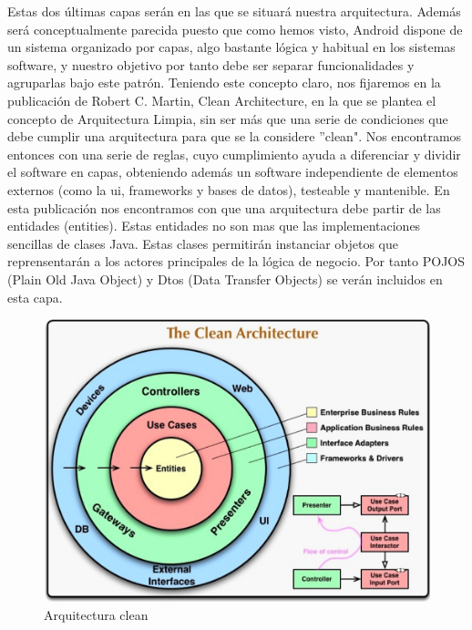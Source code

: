 \documentclass[12pt,a4paper,oneside]{book} %
\begin{document}
Estas dos últimas capas serán en las que se situará nuestra arquitectura. Además será conceptualmente parecida puesto que como hemos visto, Android dispone de un sistema organizado por capas, algo bastante lógica y habitual en los sistemas software, y nuestro objetivo por tanto debe ser separar funcionalidades y agruparlas bajo este patrón.
\newpage
\break
Teniendo este concepto claro, nos fijaremos en la publicación de Robert C. Martin, Clean Architecture, en la que se plantea el concepto de Arquitectura Limpia, sin ser más que una serie de condiciones que debe cumplir una arquitectura para que se la considere ”clean". Nos encontramos entonces con una serie de reglas, cuyo cumplimiento ayuda a diferenciar y dividir el software en capas, obteniendo además un software independiente de elementos externos (como la ui, frameworks y bases de datos), testeable y mantenible. 
\newline
\newline
En esta publicación nos encontramos con que una arquitectura debe partir de las entidades (entities). Estas entidades no son mas que las implementaciones sencillas de clases Java. 
\newline
\newline
Estas clases permitirán instanciar objetos que reprensentarán a los actores principales de la lógica de negocio. Por tanto POJOS (Plain Old Java Object) y Dtos (Data Transfer Objects) se verán incluidos en esta capa. 
\begin{figure}[H]
	\begin{center}
		\includegraphics[scale=0.3]{pictures/architecture/android_architecture.png} 
	\end{center}
	\caption[Clean Architecture]{Arquitectura clean}
\end{figure}
\end{document}
